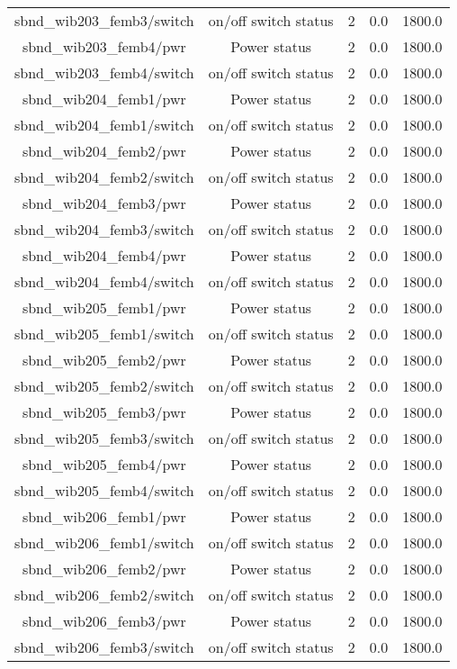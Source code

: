 \begin{table}[ptb]
\begin{tabular}{c | c c c c}
sbnd_wib203_femb3/switch & on/off switch status & 2 & 0.0 & 1800.0\\ 
sbnd_wib203_femb4/pwr & Power status & 2 & 0.0 & 1800.0\\ 
sbnd_wib203_femb4/switch & on/off switch status & 2 & 0.0 & 1800.0\\ 
sbnd_wib204_femb1/pwr & Power status & 2 & 0.0 & 1800.0\\ 
sbnd_wib204_femb1/switch & on/off switch status & 2 & 0.0 & 1800.0\\ 
sbnd_wib204_femb2/pwr & Power status & 2 & 0.0 & 1800.0\\ 
sbnd_wib204_femb2/switch & on/off switch status & 2 & 0.0 & 1800.0\\ 
sbnd_wib204_femb3/pwr & Power status & 2 & 0.0 & 1800.0\\ 
sbnd_wib204_femb3/switch & on/off switch status & 2 & 0.0 & 1800.0\\ 
sbnd_wib204_femb4/pwr & Power status & 2 & 0.0 & 1800.0\\ 
sbnd_wib204_femb4/switch & on/off switch status & 2 & 0.0 & 1800.0\\ 
sbnd_wib205_femb1/pwr & Power status & 2 & 0.0 & 1800.0\\ 
sbnd_wib205_femb1/switch & on/off switch status & 2 & 0.0 & 1800.0\\ 
sbnd_wib205_femb2/pwr & Power status & 2 & 0.0 & 1800.0\\ 
sbnd_wib205_femb2/switch & on/off switch status & 2 & 0.0 & 1800.0\\ 
sbnd_wib205_femb3/pwr & Power status & 2 & 0.0 & 1800.0\\ 
sbnd_wib205_femb3/switch & on/off switch status & 2 & 0.0 & 1800.0\\ 
sbnd_wib205_femb4/pwr & Power status & 2 & 0.0 & 1800.0\\ 
sbnd_wib205_femb4/switch & on/off switch status & 2 & 0.0 & 1800.0\\ 
sbnd_wib206_femb1/pwr & Power status & 2 & 0.0 & 1800.0\\ 
sbnd_wib206_femb1/switch & on/off switch status & 2 & 0.0 & 1800.0\\ 
sbnd_wib206_femb2/pwr & Power status & 2 & 0.0 & 1800.0\\ 
sbnd_wib206_femb2/switch & on/off switch status & 2 & 0.0 & 1800.0\\ 
sbnd_wib206_femb3/pwr & Power status & 2 & 0.0 & 1800.0\\ 
sbnd_wib206_femb3/switch & on/off switch status & 2 & 0.0 & 1800.0\\ 

\end{tabular}
\end{table}
